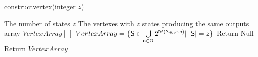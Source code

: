 \begin{algorithm}[h!]
\caption{{\sf constructvertex}(integer $z$)}
\begin{algorithmic}[1]
\REQUIRE 
The number of states $z$
\ENSURE  
The vertexes with $z$ states producing the same outputs 
\STATE array $VertexArray[\ ]$
\STATE $VertexArray=\{\mathsf{S}\in\bigcup\limits_{\mathsf{o}\in\mathcal{O}} 2^{\Ded(\mathcal{S}_\BB,\varepsilon,\mathsf{o} )}|\ |\mathsf{S}|=z\}$
\STATE  Return Null
\ELSE 
\STATE Return $VertexArray$
\ENDIF 
\end{algorithmic}
 \label{alg:2}
\end{algorithm}



